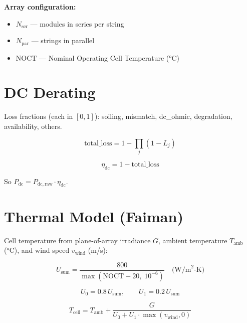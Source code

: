 \documentclass[11pt,a4paper]{article}
\begin{document}
\textbf{Array configuration:}
\begin{itemize}
  \item \(N_{\mathrm{ser}}\) — modules in series per string
  \item \(N_{\mathrm{par}}\) — strings in parallel
  \item \(\mathrm{NOCT}\) — Nominal Operating Cell Temperature (°C)
\end{itemize}

\section{DC Derating}

Loss fractions (each in \([0,1]\)): soiling, mismatch, dc\_ohmic, degradation, availability, others.

\begin{equation}
  \text{total\_loss} = 1 - \prod_{j} (1 - L_j)
\end{equation}

\begin{equation}
  \boxed{
  \eta_{\mathrm{dc}} = 1 - \text{total\_loss}
  }
\end{equation}

So \(P_{\mathrm{dc}} = P_{\mathrm{dc,raw}} \cdot \eta_{\mathrm{dc}}\).

\section{Thermal Model (Faiman)}

Cell temperature from plane-of-array irradiance \(G\), ambient temperature \(T_{\mathrm{amb}}\) (°C), and wind speed \(v_{\mathrm{wind}}\) (m/s):

\begin{equation}
  U_{\mathrm{sum}} = \frac{800}{\max(\mathrm{NOCT} - 20,\; 10^{-6})}
  \quad \text{(W/m}^2\text{-K)}
\end{equation}

\begin{equation}
  U_0 = 0.8\, U_{\mathrm{sum}}, \qquad U_1 = 0.2\, U_{\mathrm{sum}}
\end{equation}

\begin{equation}
  \boxed{
  T_{\mathrm{cell}} = T_{\mathrm{amb}} + \frac{G}{U_0 + U_1\cdot\max(v_{\mathrm{wind}}, 0)}
  }
\end{equation}
\end{document}
